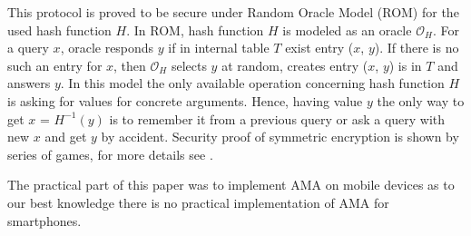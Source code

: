 \documentclass[11pt,titlepage]{article}
\theoremstyle{plain}
\begin{document}
\vspace{5mm}

This protocol is proved to be secure under Random Oracle Model (ROM) for the used
hash function $H$. In ROM, hash function $H$ is modeled as an oracle $\mathcal{O}_H$. For a query $x$, oracle responds $y$ if in internal table $T$ exist entry ($x$, $y$). If there is no such an entry for $x$, then $\mathcal{O}_H$ selects $y$ at random, creates entry ($x$, $y$) is in $T$ and answers $y$. In this model the only available operation concerning hash function $H$ is asking for values for concrete arguments. Hence, having value $y$ the only way to get $x$ = $H^{-1}(y)$ is to remember it from a previous query or ask a query with new $x$ and get $y$ by accident. Security proof of symmetric encryption is shown by series of games, for more details see \cite{AMA}. 

\vspace{5mm}

The practical part of this paper was to implement AMA on mobile devices as to our best knowledge there is no practical implementation of AMA for smartphones.
\end{document}
